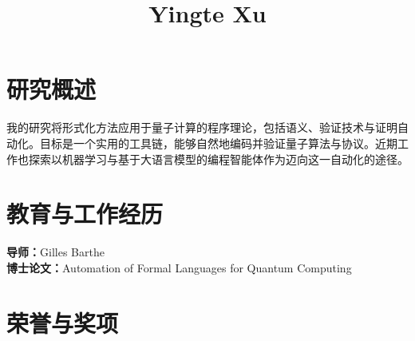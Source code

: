 \documentclass[11pt,a4paper]{moderncv}
\title{Yingte Xu}
\begin{document}
\makecvtitle

\section{研究概述}

我的研究将形式化方法应用于量子计算的程序理论，包括语义、验证技术与证明自动化。目标是一个实用的工具链，能够自然地编码并验证量子算法与协议。近期工作也探索以机器学习与基于大语言模型的编程智能体作为迈向这一自动化的途径。


\par\medskip





\section{教育与工作经历}

{\textbf{导师：}Gilles Barthe \\
\textbf{博士论文：}Automation of Formal Languages for Quantum Computing}



\vspace{1em}


\vspace{1em}

{}

\section{荣誉与奖项}
\end{document}
